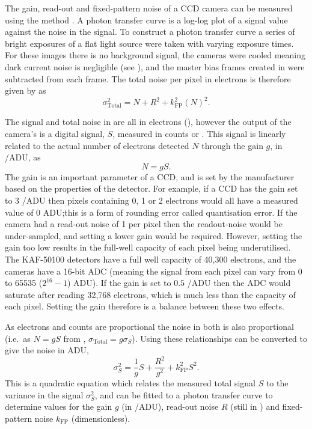 \begin{colsection}
\begin{colsection}
The gain, read-out and fixed-pattern noise of a CCD camera can be measured using the  method \citep{CCDs, PTC}. A photon transfer curve is a log-log plot of a signal value against the noise in the signal. To construct a photon transfer curve a series of bright exposures of a flat light source were taken with varying exposure times. For these images there is no background signal, the cameras were cooled meaning dark current noise is negligible (see ), and the master bias frames created in  were subtracted from each frame. The total noise per pixel in electrons is therefore given by  as
%
\begin{equation}
    \sigma_\text{Total}^2 = N + R^2 + k_\text{FP}^2{(N)}^2.
    \label{eq:noise_2}
\end{equation}

The signal and total noise in  are all in electrons (\elec), however the output of the camera's  is a digital signal, $S$, measured in counts or . This signal is linearly related to the actual number of electrons detected $N$ through the gain $g$, in \elec/ADU, as
%
\begin{equation}
    N = g S.
    \label{eq:gain}
\end{equation}
%
The gain is an important parameter of a CCD, and is set by the manufacturer based on the properties of the detector. For example, if a CCD has the gain set to 3 \elec/ADU then pixels containing 0, 1 or 2 electrons would all have a measured value of 0 ADU;\@ this is a form of rounding error called quantisation error. If the camera had a read-out noise of 1 \elec{} per pixel then the readout-noise would be under-sampled, and setting a lower gain would be required. However, setting the gain too low results in the full-well capacity of each pixel being underutilised. The KAF-50100 detectors have a full well capacity of 40,300 electrons, and the cameras have a 16-bit ADC (meaning the signal from each pixel can vary from 0 to 65535 ($2^{16}-1$) ADU). If the gain is set to $0.5$ \elec/ADU then the ADC would saturate after reading 32,768 electrons, which is much less than the capacity of each pixel. Setting the gain therefore is a balance between these two effects.

As electrons and counts are proportional the noise in both is also proportional (i.e.\ as $N=gS$ from ,  $\sigma_\text{Total} = g\sigma_S$). Using these relationships  can be converted to give the noise in ADU,
%
\begin{equation}
    \sigma_S^2 = \frac{1}{g} S + \frac{R^2}{g^2} + k_\text{FP}^2 S^2.
    \label{eq:ptc}
\end{equation}
%
This is a quadratic equation which relates the measured total signal $S$ to the variance in the signal $\sigma_S^2$, and can be fitted to a photon transfer curve to determine values for the gain $g$ (in \elec/ADU), read-out noise $R$ (still in \elec{}) and fixed-pattern noise $k_\text{FP}$ (dimensionless).


\end{colsection}
\end{colsection}
